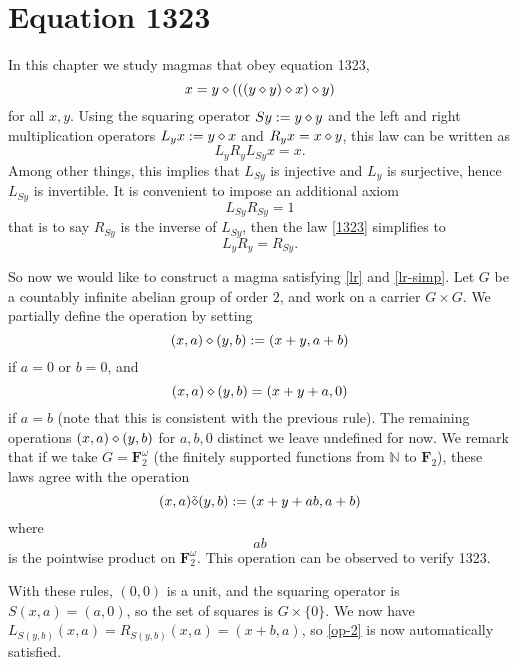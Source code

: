 \chapter{Equation 1323}\label{1323-chapter}

In this chapter we study magmas that obey equation 1323,
\begin{equation}\label{1323}
  x = y \diamond (((y \diamond y) \diamond x) \diamond y)
\end{equation}
for all $x,y$.  Using the squaring operator $Sy := y \diamond y$ and the left and right multiplication operators $L_y x := y \diamond x$ and $R_y x = x \diamond y$, this law can be written as
$$ L_y R_y L_{Sy} x = x.$$
Among other things, this implies that $L_{Sy}$ is injective and $L_y$ is surjective, hence $L_{Sy}$ is invertible.  It is convenient to impose an additional axiom
\begin{equation}\label{lr}
 L_{Sy} R_{Sy} = 1
\end{equation}
that is to say $R_{Sy}$ is the inverse of $L_{Sy}$, then the law \eqref{1323} simplifies to
\begin{equation}\label{lr-simp}
  L_{y} R_{y} = R_{Sy}.
 \end{equation}

 So now we would like to construct a magma satisfying \eqref{lr} and \eqref{lr-simp}.  Let $G$ be a countably infinite abelian group of order $2$, and work on a carrier $G \times G$.  We partially define the operation by setting
\begin{equation}\label{op-1}
 (x,a) \diamond (y,b) := (x+y, a+b)
\end{equation}
if $a=0$ or $b=0$, and
\begin{equation}\label{op-2}
  (x,a) \diamond (y,b) = (x+y+a, 0)
\end{equation}
if $a=b$ (note that this is consistent with the previous rule).   The remaining operations $(x,a) \diamond (y,b)$ for $a,b,0$ distinct we leave undefined for now.  We remark that if we take $G = {\mathbf F}_2^{\omega}$ (the finitely supported functions from ${\mathbb N}$ to ${\mathbf F}_2$), these laws agree with the operation
$$ (x,a) \tilde {\diamond} (y,b) := (x+y+ab, a+b)$$
where $$ab$$ is the pointwise product on ${\mathbf F}_2^{\omega}$. This operation can be observed to verify 1323.

With these rules, $(0,0)$ is a unit, and the squaring operator is $S(x,a) = (a,0)$, so the set of squares is $G \times \{0\}$.  We now have $L_{S(y,b)} (x,a) = R_{S(y,b)} (x,a) = (x+b, a)$, so \eqref{op-2} is now automatically satisfied.

